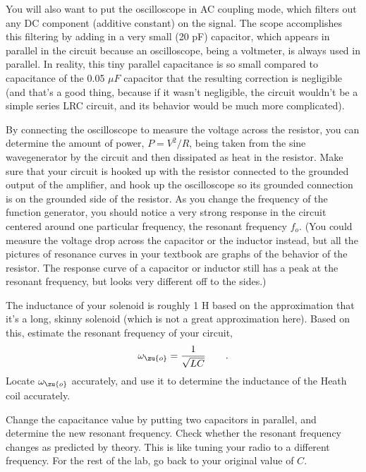 You will also want to put the oscilloscope in AC coupling mode, which
filters out any DC component (additive constant) on the signal.
The scope accomplishes this filtering by adding in a very small
(20 pF) capacitor, which appears in parallel in the circuit because
an oscilloscope, being a voltmeter, is always used in parallel.
In reality, this tiny parallel capacitance is so small compared to
capacitance of the 0.05 $\mu F$ capacitor that the resulting correction
is negligible (and that's a good thing, because if it wasn't negligible,
the circuit wouldn't be a simple series LRC circuit, and its behavior
would be much more complicated).

\observations


By connecting the oscilloscope to measure the voltage across
the resistor, you can determine the amount of power,
$P=V^2/R$, being taken from the sine wavegenerator by the
circuit and then dissipated as heat in the resistor. Make
sure that your circuit is hooked up with the resistor
connected to the grounded output of the amplifier, and hook
up the oscilloscope so its grounded connection is on the
grounded side of the resistor. As you change the frequency
of the function generator, you should notice a very strong
response in the circuit centered around one particular
frequency, the resonant frequency $f_o$. (You could measure
the voltage drop across the capacitor or the inductor
instead, but all the pictures of resonance curves in your
textbook are graphs of the behavior of the resistor. The
response curve of a capacitor or inductor still has a peak
at the resonant frequency, but looks very different off to the sides.)

The inductance of your solenoid is roughly 1 H based on the approximation
that it's a long, skinny solenoid (which is not a great approximation here).
 Based on this,
estimate the resonant frequency of your circuit,
\begin{equation*}
	\omega_\zu{o}=\frac{1}{\sqrt{LC}}  \qquad   .
\end{equation*}
Locate  $\omega_\zu{o}$ accurately, and use it to determine the
inductance of the Heath coil accurately.


Change the capacitance value by putting two capacitors in parallel, and determine the new resonant
frequency. Check whether the resonant frequency changes as
predicted by theory. This is like tuning your radio to a
different frequency. For the rest of the lab, go back to
your original value of $C$.

